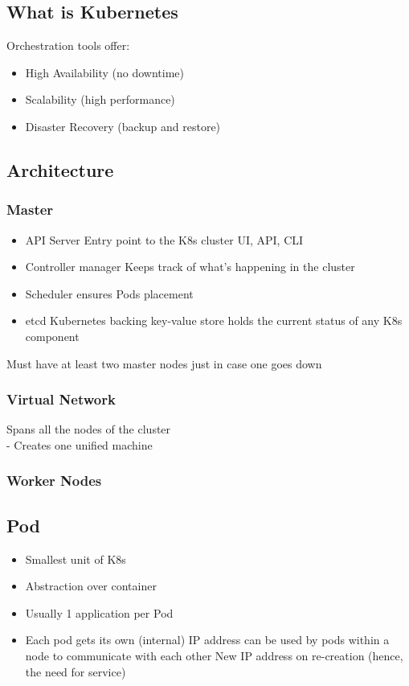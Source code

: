 

\subsection{What is Kubernetes}\label{subsec:what-is-kubernetes}
Orchestration tools offer:
\begin{itemize}
    \item High Availability (no downtime)
    \item Scalability (high performance)
    \item Disaster Recovery (backup and restore)
\end{itemize}

\subsection{Architecture}\label{subsec:architecture}
\subsubsection{Master}
\begin{itemize}
    \item API Server
    \subitem Entry point to the K8s cluster
    \subitem UI, API, CLI

    \item Controller manager
    \subitem Keeps track of what's happening in the cluster

    \item Scheduler
    \subitem ensures Pods placement

    \item etcd
    \subitem Kubernetes backing key-value store
    \subitem holds the current status of any K8s component
\end{itemize}
Must have at least two master nodes just in case one goes down

\subsubsection{Virtual Network}
Spans all the nodes of the cluster\\
 - Creates one unified machine

\subsubsection{Worker Nodes}

\subsection{Pod}\label{subsec:pod}
\begin{itemize}
    \item Smallest unit of K8s
    \item Abstraction over container
    \item Usually 1 application per Pod
    \item Each pod gets its own (internal) IP address
    \subitem can be used by pods within a node to communicate with each other
    \subitem New IP address on re-creation (hence, the need for service)
\end{itemize}

